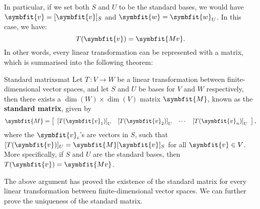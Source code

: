 \documentclass[math]{amznotes}
\theoremstyle{remark}
\begin{document}
In particular, if we set both $S$ and $U$ to be the standard bases, we would have $\symbfit{v} = [\symbfit{v}]_S$ and $\symbfit{w} = \symbfit{w}_U$. In this case, we have:
\begin{equation*}
    T(\symbfit{v}) = \symbfit{Mv}.
\end{equation*}
In other words, every linear transformation can be represented with a matrix, which is summarised into the following theorem:
\begin{thmbox}{Standard matrix}{smat}
    Let $T \,\colon V \rightarrow W$ be a linear transformation between finite-dimensional vector spaces, and let $S$ and $U$ be bases for $V$ and $W$ respectively, then there exists a $\dim(W) \times \dim(V)$ matrix $\symbfit{M}$, known as the {\color{red} \textbf{standard matrix}}, given by
    \begin{equation*}
        \symbfit{M} = \left[\begin{array}{cccc}
            \left[T(\symbfit{v}_1)\right]_U & \left[T(\symbfit{v}_2)\right]_U & \cdots & \left[T(\symbfit{v}_n)\right]_U
        \end{array}\right],
    \end{equation*}
    where the $\symbfit{v}_i$'s are vectors in $S$, such that $[T(\symbfit{v})]_U = \symbfit{M}[\symbfit{v}]_S$ for all $\symbfit{v} \in V$. More specifically, if $S$ and $U$ are the standard bases, then $T(\symbfit{v}) = \symbfit{Mv}$.
\end{thmbox}
The above argument has proved the existence of the standard matrix for every linear transformation between finite-dimensional vector spaces. We can further prove the uniqueness of the standard matrix.
\end{document}
